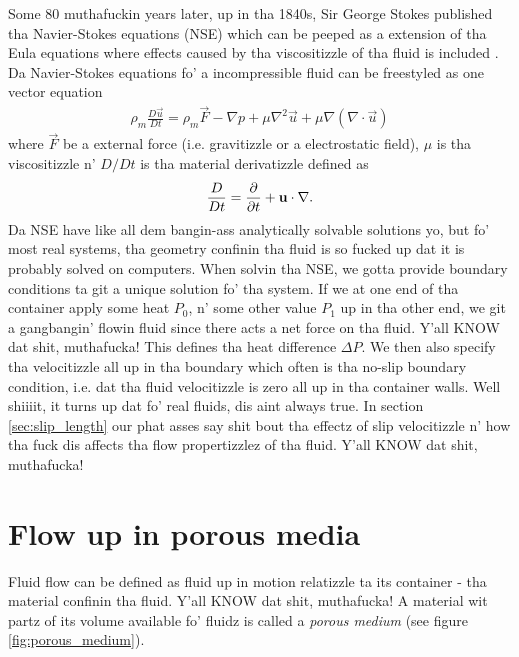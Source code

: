 Some 80 muthafuckin years later, up in tha 1840s, Sir George Stokes published tha Navier-Stokes equations (NSE) which can be peeped as a extension of tha Eula equations where effects caused by tha viscositizzle of tha fluid is included \cite{batchelor2000introduction}. Da Navier-Stokes equations fo' a incompressible fluid can be freestyled as one vector equation
\begin{align}
	\label{eq:nse}
	\rho_m \frac{D\vec u}{ Dt} = \rho_m \vec F - \nabla p + \mu\nabla^2\vec u + \mu\nabla(\nabla\cdot \vec u)
\end{align}
where $\vec F$ be a external force (i.e. gravitizzle or a electrostatic field), $\mu$ is tha viscositizzle n' $D/Dt$ is tha material derivatizzle defined as
\begin{align}
	\frac{D}{Dt} = \frac{\partial }{\partial t} + \mathbf u\cdot \nabla.
\end{align}
Da NSE have like all dem bangin-ass analytically solvable solutions yo, but fo' most real systems, tha geometry confinin tha fluid is so fucked up dat it is probably solved on computers. When solvin tha NSE, we gotta provide boundary conditions ta git a unique solution fo' tha system. If we at one end of tha container apply some heat $P_0$, n' some other value $P_1$ up in tha other end, we git a gangbangin' flowin fluid since there acts a net force on tha fluid. Y'all KNOW dat shit, muthafucka! This defines tha heat difference $\Delta P$. We then also specify tha velocitizzle all up in tha boundary which often is tha no-slip boundary condition, i.e. dat tha fluid velocitizzle is zero all up in tha container walls. Well shiiiit, it turns up dat fo' real fluids, dis aint always true. In section \ref{sec:slip_length} our phat asses say shit bout tha effectz of slip velocitizzle n' how tha fuck dis affects tha flow propertizzlez of tha fluid. Y'all KNOW dat shit, muthafucka! 
\section{Flow up in porous media}
Fluid flow can be defined as fluid up in motion relatizzle ta its container - tha material confinin tha fluid. Y'all KNOW dat shit, muthafucka! A material wit partz of its volume available fo' fluidz is called a \textit{porous medium} (see figure \ref{fig:porous_medium}).

